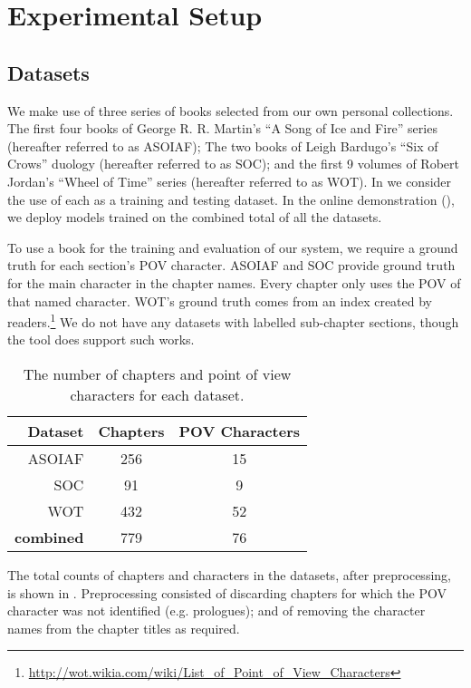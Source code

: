 \documentclass[11pt,a4paper]{article}
\begin{document}
\section{Experimental Setup}\label{sec:experimental-setup}
\subsection{Datasets}
We make use of three series of books selected from our own personal collections.
The first four books of George R. R. Martin's ``A Song of Ice and Fire'' series (hereafter referred to as ASOIAF);
The two books of  Leigh Bardugo's ``Six of Crows'' duology (hereafter referred to as SOC);
and the first 9 volumes of Robert Jordan's ``Wheel of Time'' series (hereafter referred to as WOT).
In  we consider the use of each as a training and testing dataset.
In the online demonstration (), we deploy models trained on the combined total of all the datasets.

To use a book for the training and evaluation of our system, we require a ground truth for each section's POV character.
ASOIAF and SOC provide ground truth for the main character in the chapter names.
Every chapter only uses the POV of that named character.
WOT's ground truth comes from an index created by readers.\footnote{\url{http://wot.wikia.com/wiki/List_of_Point_of_View_Characters}}
We do not have any datasets with labelled sub-chapter sections, though the tool does support such works.


\begin{table}
	\begin{tabular}{rcc}
		Dataset & Chapters & POV Characters\\
		\toprule
		ASOIAF  & 256	&	15\\
		SOC		& 91	&	9\\
		WOT     & 432   &   52\\
		\midrule
		\textbf{combined}  &  779 & 76
	\end{tabular}
	\caption{The number of chapters and point of view characters for each dataset. \label{tbl:datasets}}
\end{table}

The total counts of chapters and characters in the datasets, after preprocessing, is shown in .
Preprocessing consisted of  discarding chapters for which the POV character was not identified (e.g. prologues); and of removing the character names from the chapter titles as required.
\end{document}
